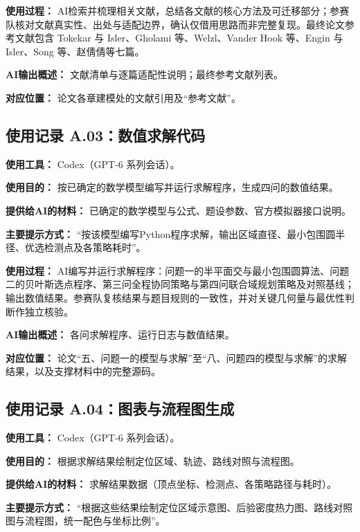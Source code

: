 \documentclass[UTF8,a4paper,zihao=-4]{ctexart}
\begin{document}
\noindent\textbf{使用过程：} AI检索并梳理相关文献，总结各文献的核心方法及可迁移部分；参赛队核对文献真实性、出处与适配边界，确认仅借用思路而非完整复现。最终论文参考文献包含 Tokekar 与 Isler、Gholami 等、Welzl、Vander Hook 等、Engin 与 Isler、Song 等、赵倩倩等七篇。

\noindent\textbf{AI输出概述：} 文献清单与逐篇适配性说明；最终参考文献列表。

\noindent\textbf{对应位置：} 论文各章建模处的文献引用及“参考文献”。

\subsection*{使用记录 A.03：数值求解代码}

\noindent\textbf{使用工具：} Codex（GPT-6 系列会话）。

\noindent\textbf{使用目的：} 按已确定的数学模型编写并运行求解程序，生成四问的数值结果。

\noindent\textbf{提供给AI的材料：} 已确定的数学模型与公式、题设参数、官方模拟器接口说明。

\noindent\textbf{主要提示方式：} “按该模型编写Python程序求解，输出区域直径、最小包围圆半径、优选检测点及各策略耗时”。

\noindent\textbf{使用过程：} AI编写并运行求解程序：问题一的半平面交与最小包围圆算法、问题二的贝叶斯选点程序、第三问全程协同策略与第四问联合域规划策略及对照基线；输出数值结果。参赛队复核结果与题目规则的一致性，并对关键几何量与最优性判断作独立核验。

\noindent\textbf{AI输出概述：} 各问求解程序、运行日志与数值结果。

\noindent\textbf{对应位置：} 论文“五、问题一的模型与求解”至“八、问题四的模型与求解”的求解结果，以及支撑材料中的完整源码。

\subsection*{使用记录 A.04：图表与流程图生成}

\noindent\textbf{使用工具：} Codex（GPT-6 系列会话）。

\noindent\textbf{使用目的：} 根据求解结果绘制定位区域、轨迹、路线对照与流程图。

\noindent\textbf{提供给AI的材料：} 求解结果数据（顶点坐标、检测点、各策略路径与耗时）。

\noindent\textbf{主要提示方式：} “根据这些结果绘制定位区域示意图、后验密度热力图、路线对照图与流程图，统一配色与坐标比例”。
\end{document}
